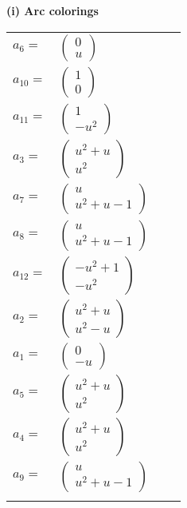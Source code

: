 \documentclass[1p]{elsarticle_modified}
\theoremstyle{definition}
\begin{document}
\flushleft \textbf{(i) Arc colorings}\\
\begin{tabular}{m{7pt} m{180pt} m{7pt} m{180pt} }
\flushright $a_{6}=$&$\begin{pmatrix}0\\u\end{pmatrix}$ \\
\flushright $a_{10}=$&$\begin{pmatrix}1\\0\end{pmatrix}$ \\
\flushright $a_{11}=$&$\begin{pmatrix}1\\- u^2\end{pmatrix}$ \\
\flushright $a_{3}=$&$\begin{pmatrix}u^2+u\\u^2\end{pmatrix}$ \\
\flushright $a_{7}=$&$\begin{pmatrix}u\\u^2+u-1\end{pmatrix}$ \\
\flushright $a_{8}=$&$\begin{pmatrix}u\\u^2+u-1\end{pmatrix}$ \\
\flushright $a_{12}=$&$\begin{pmatrix}- u^2+1\\- u^2\end{pmatrix}$ \\
\flushright $a_{2}=$&$\begin{pmatrix}u^2+u\\u^2- u\end{pmatrix}$ \\
\flushright $a_{1}=$&$\begin{pmatrix}0\\- u\end{pmatrix}$ \\
\flushright $a_{5}=$&$\begin{pmatrix}u^2+u\\u^2\end{pmatrix}$ \\
\flushright $a_{4}=$&$\begin{pmatrix}u^2+u\\u^2\end{pmatrix}$ \\
\flushright $a_{9}=$&$\begin{pmatrix}u\\u^2+u-1\end{pmatrix}$\\&\end{tabular}
\end{document}
